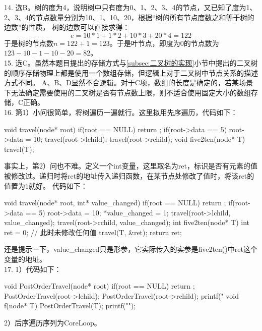 14. 选B。树的度为4，说明树中只有度为0、1、2、3、4的节点，又已知了度为1、2、3、4的节点数量分别为10、1、10、20，根据“树的所有节点度数之和等于树的边数”的性质，
树的边数可以直接求得：
\[
    e = 10 * 1 + 1 * 2 + 10 * 3 + 20 * 4 = 122
\]
于是树的节点数$n=122+1=123$。于是叶节点，即度为0的节点数为$123-10-1-10-20=82$。\\

15. 选C。虽然本题目提出的存储方式与\ref{subsec:二叉树的实现}小节中提出的二叉树的顺序存储物理上都是使用一个数组存储，但逻辑上对于二叉树中节点关系的描述方式不同。
A、B、D显然不合逻辑。对于C项，数组的长度是确定的，若某场景下无法确定需要使用的二叉树是否有节点数上限，则不适合使用固定大小的数组存储，C正确。\\

16. 第1）小问很简单，将树遍历一遍就行。这里拟用先序遍历，代码如下：

\begin{cppcode}
    void travel(node* root) {
        if(root == NULL) return ;
        if(root->data == 5) root->data = 10;
        travel(root->lchild);
        travel(root->rchild);
    }
    void five2ten(node* T) {
        travel(T);
    }
\end{cppcode}
事实上，第2）问也不难。定义一个int变量，这里取名为ret，标识是否有元素的值被修改过。递归时将ret的地址传入递归函数，在某节点处修改了值时，将该ret的值置为1就好。
代码如下：
\begin{cppcode}
    void travel(node* root, int* value_changed) {
        if(root == NULL) return ;
        if(root->data == 5) {
            root->data = 10;
            *value_changed = 1;
        }
        travel(root->lchild, value_changed);
        travel(root->rchild, value_changed);
    }
    int five2ten(node* T) {
        int ret = 0;    // 此时未修改任何值
        travel(T, &ret);
        return ret;
    }
\end{cppcode}
还是提示一下，value\_changed只是形参，它实际传入的实参是five2ten()中ret这个变量的地址。\\

17. 1）代码如下：
\begin{cppcode}
    void PostOrderTravel(node* root) {
        if(root == NULL) return ;
        PostOrderTravel(root->lchild);
        PostOrderTravel(root->rchild);
        printf("%
    }
    void f(node* T) {
        PostOrderTravel(T);
        printf("\n");
    }
\end{cppcode}
2）后序遍历序列为CoreLoop。\\

